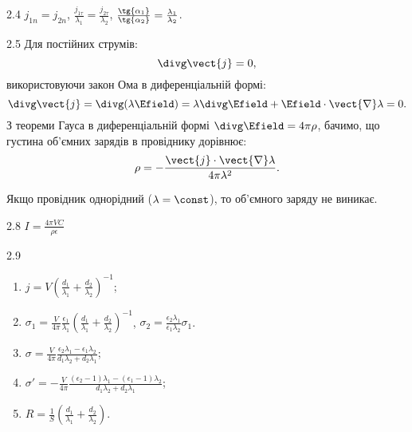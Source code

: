 \protect \section *{}
\begin{Solution}{2.{4}}
	$j_{1n} = j_{2n}$, $\frac{j_{1\tau}}{\lambda_1} = \frac{j_{2\tau}}{\lambda_2}$,
	$\frac{\tg{\alpha_1}}{\tg{\alpha_2}} = \frac{\lambda_1}{\lambda_2}$.
\end{Solution}
\begin{Solution}{2.{5}}
	Для постійних струмів:
	\begin{equation}
		\divg\vect{j} = 0,
	\end{equation}
	використовуючи закон Ома в диференціальній формі:
	\begin{equation}
		\divg\vect{j} = \divg(\lambda\Efield) = \lambda\divg\Efield + \Efield\cdot\vect{\nabla}\lambda = 0.
	\end{equation}
	З теореми Гауса в диференціальній формі $\divg\Efield = 4\pi\rho$, бачимо, що густина об'ємних зарядів в провіднику дорівнює:
	\begin{equation}
		\rho = - \frac{\vect{j}\cdot\vect{\nabla}\lambda}{4\pi\lambda^2}.
	\end{equation}

	Якщо провідник однорідний ($\lambda = \const$), то об'ємного заряду не виникає.
\end{Solution}
\begin{Solution}{2.{8}}
	$ I = \frac{4\pi VC}{\rho \epsilon} $
\end{Solution}
\begin{Solution}{2.{9}}
	\begin{enumerate}[label=\alph*)]
		\item  $j = V\left( \frac{d_1}{\lambda_1} + \frac{d_2}{\lambda_2}\right)^{-1}$;
		\item $\sigma_1  = \frac{V}{4\pi} \frac{\epsilon_1}{\lambda_1} \left( \frac{d_1}{\lambda_1} + \frac{d_2}{\lambda_2}\right)^{-1}$, $\sigma_2  = \frac{\epsilon_2\lambda_1}{\epsilon_1\lambda_2} \sigma_1$.
		\item $\sigma = \frac{V}{4\pi} \frac{\epsilon_2\lambda_1 - \epsilon_1\lambda_2}{d_1\lambda_2 + d_2\lambda_1}$;
		\item $\sigma' = - \frac{V}{4\pi} \frac{(\epsilon_2 - 1)\lambda_1 - (\epsilon_1 - 1)\lambda_2}{d_1\lambda_2 + d_2\lambda_1}$;
		\item $R = \frac1S\left( \frac{d_1}{\lambda_1} + \frac{d_2}{\lambda_2}\right) $.
	\end{enumerate}
\end{Solution}
